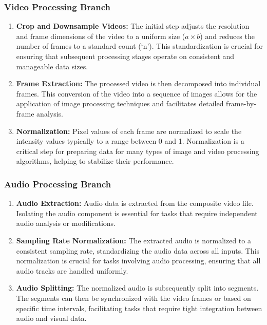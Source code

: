 \documentclass{ioereport}
\begin{document}
    \subsubsection{Video Processing Branch}
    \begin{enumerate}[label=\textbf{\roman*.}]
        \item \textbf{Crop and Downsample Videos:}
        The initial step adjusts the resolution and frame dimensions of the video to a uniform size (\(a \times b\)) and reduces the number of frames to a standard count (`n'). This standardization is crucial for ensuring that subsequent processing stages operate on consistent and manageable data sizes.
        
        \item \textbf{Frame Extraction:}
        The processed video is then decomposed into individual frames. This conversion of the video into a sequence of images allows for the application of image processing techniques and facilitates detailed frame-by-frame analysis.
        
        \item \textbf{Normalization:}
        Pixel values of each frame are normalized to scale the intensity values typically to a range between 0 and 1. Normalization is a critical step for preparing data for many types of image and video processing algorithms, helping to stabilize their performance.
    \end{enumerate}
    
    \subsubsection{Audio Processing Branch}
    
    \begin{enumerate}[label=\textbf{\roman*.}]
        \item \textbf{Audio Extraction:}
        Audio data is extracted from the composite video file. Isolating the audio component is essential for tasks that require independent audio analysis or modifications.
        
        \item \textbf{Sampling Rate Normalization:}
        The extracted audio is normalized to a consistent sampling rate, standardizing the audio data across all inputs. This normalization is crucial for tasks involving audio processing, ensuring that all audio tracks are handled uniformly.
        
        \item \textbf{Audio Splitting:}
        The normalized audio is subsequently split into segments. The segments can then be synchronized with the video frames or based on specific time intervals, facilitating tasks that require tight integration between audio and visual data.
    \end{enumerate}
    
\end{document}
